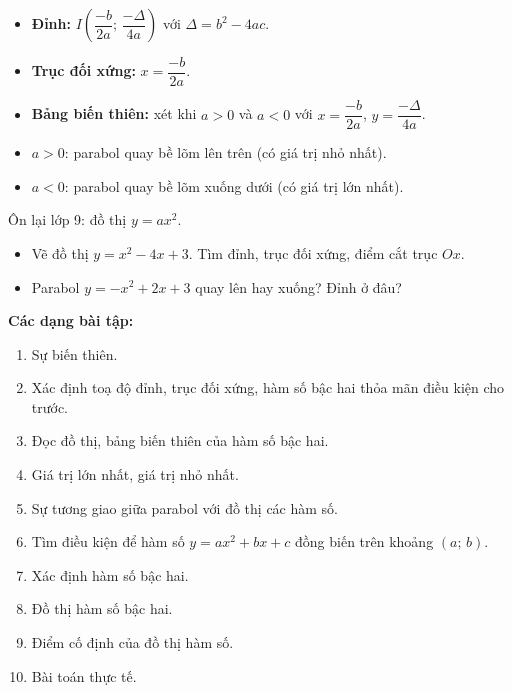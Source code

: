 \documentclass[12pt,a4paper]{article}
\begin{document}
\begin{congthuc}[title={Các yếu tố của parabol}]
  \begin{itemize}
    \item \textbf{Đỉnh:} $I\!\left(\dfrac{-b}{2a};\, \dfrac{-\Delta}{4a}\right)$ với $\Delta = b^2 - 4ac$.
    \item \textbf{Trục đối xứng:} $x = \dfrac{-b}{2a}$.
    \item \textbf{Bảng biến thiên:} xét khi $a > 0$ và $a < 0$ với $x = \dfrac{-b}{2a}$, $y = \dfrac{-\Delta}{4a}$.
  \end{itemize}
\end{congthuc}

\begin{tinhchat}
  \begin{itemize}
    \item $a > 0$: parabol quay bề lõm lên trên (có giá trị nhỏ nhất).
    \item $a < 0$: parabol quay bề lõm xuống dưới (có giá trị lớn nhất).
  \end{itemize}
\end{tinhchat}

\begin{luuy}
  Ôn lại lớp 9: đồ thị $y = ax^2$.
\end{luuy}

\begin{vidu}
  \begin{itemize}
    \item Vẽ đồ thị $y = x^2 - 4x + 3$. Tìm đỉnh, trục đối xứng, điểm cắt trục $Ox$.
    \item Parabol $y = -x^2 + 2x + 3$ quay lên hay xuống? Đỉnh ở đâu?
  \end{itemize}
\end{vidu}

\medskip\noindent\textbf{Các dạng bài tập:}
\begin{enumerate}[label=\textbf{Dạng \arabic*:}, leftmargin=*, align=left]
  \item Sự biến thiên.
  \item Xác định toạ độ đỉnh, trục đối xứng, hàm số bậc hai thỏa mãn điều kiện cho trước.
  \item Đọc đồ thị, bảng biến thiên của hàm số bậc hai.
  \item Giá trị lớn nhất, giá trị nhỏ nhất.
  \item Sự tương giao giữa parabol với đồ thị các hàm số.
  \item Tìm điều kiện để hàm số $y = ax^2 + bx + c$ đồng biến trên khoảng $(a;\, b)$.
  \item Xác định hàm số bậc hai.
  \item Đồ thị hàm số bậc hai.
  \item Điểm cố định của đồ thị hàm số.
  \item Bài toán thực tế.
\end{enumerate}
\end{document}
